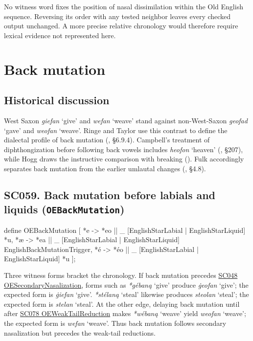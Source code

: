 \documentclass[
  british,
  a4paper,
  openany]{book}
\providecommand{\Recon}[1]{\emph{*#1}}
{\catcode`→=\active \global\def→{\ensuremath{\rightarrow}}}
\providecommand{\texorpdfstring}[2]{#1}
\providecommand{\Recon}[1]{\emph{*#1}}
{\catcode`→=\active \global\def→{\ensuremath{\rightarrow}}}
\begin{document}
No witness word fixes the position of nasal dissimilation within the Old
English sequence. Reversing its order with any tested neighbor leaves
every checked output unchanged. A more precise relative chronology would
therefore require lexical evidence not represented here.

\newpage

\section{Back mutation}\label{back-mutation}

\subsection{Historical discussion}\label{historical-discussion-31}

West Saxon \emph{giefan} `give' and \emph{wefan} `weave' stand against
non-West-Saxon \emph{geofad} `gave' and \emph{weofan} `weave'. Ringe and
Taylor use this contrast to define the dialectal profile of back
mutation (,
§6.9.4). Campbell's treatment of diphthongization before following back
vowels includes \emph{heofon} `heaven'
(, §207), while Hogg draws
the instructive comparison with breaking (). Fulk accordingly separates back mutation from the earlier
umlautal changes (, §4.8).

\subsection{\texorpdfstring{SC059. Back mutation before labials and
liquids
(\texttt{OEBackMutation})}{SC059. Back mutation before labials and liquids (OEBackMutation)}}\label{rule-OEBackMutation}

\begin{ReaderFacingFoma}
define OEBackMutation [
    {*e} -> {*eo} || _ [EnglishStarLabial | EnglishStarLiquid] {*u},
    {*æ} -> {*ea} || _ [EnglishStarLabial | EnglishStarLiquid] EnglishBackMutationTrigger,
    {*é} -> {*éo} || _ [EnglishStarLabial | EnglishStarLiquid] {*u}
];
\end{ReaderFacingFoma}

Three witness forms bracket the chronology. If back mutation precedes
\hyperref[rule-OESecondaryNasalization]{SC048 OESecondaryNasalization},
forms such as \Recon{gébaną} `give' produce \emph{ġeofan} `give'; the
expected form is \emph{ġiefan} `give'. \Recon{stélaną} `steal' likewise
produces \emph{steolan} `steal'; the expected form is \emph{stelan}
`steal'. At the other edge, delaying back mutation until after
\hyperref[rule-OEWeakTailReduction]{SC078 OEWeakTailReduction} makes
\Recon{wébaną} `weave' yield \emph{weofan} `weave'; the expected form is
\emph{wefan} `weave'. Thus back mutation follows secondary nasalization
but precedes the weak-tail reductions.
\end{document}
